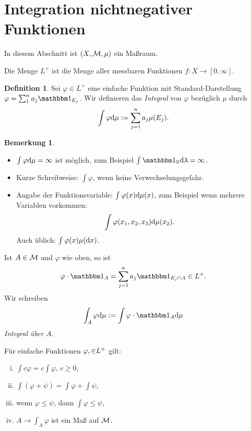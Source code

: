 \documentclass[
 a4paper,
 12pt,
 parskip=half
 ]{scrreprt}
\theoremstyle{plain}
\theoremstyle{definition}
\newtheorem{defn}[thm]{Definition}
\newtheorem*{rmrk*}{Bemerkung}
\numberwithin{equation}{section}
\begin{document}
\section{Integration nichtnegativer Funktionen}
In diesem Abschnitt ist $(X,\mathcal{M},\mu)$ ein Maßraum.

Die Menge $L^+$ ist die Menge aller messbaren Funktionen $f:X \to [0, \infty]$.

\begin{defn}
 Sei $\varphi \in L^+$ eine einfache Funktion mit Standard-Darstellung $\varphi = \sum_1^n a_j \ind_{E_j}$. Wir definieren das \emph{Integral} von $\varphi$ bezüglich $\mu$ durch
 \[ \int \varphi \mathrm{d} \mu := \sum_{j=1}^n a_j \mu( E_j ). \]
\end{defn}

\begin{rmrk*}
 \begin{itemize}
  \item $\int \varphi \mathrm{d} \mu = \infty$ ist möglich, zum Beispiel $\int \ind_\real \diffop \lambda = \infty$.
  \item Kurze Schreibweise: $\int \varphi$, wenn keine Verwechselungsgefahr.
  \item Angabe der Funktionsvariable: $\int \varphi(x) \mathrm{d} \mu(x)$, zum Beispiel wenn mehrere Variablen vorkommen:
  \[ \int \varphi( x_1, x_2, x_3 ) \mathrm{d} \mu(x_2). \]
  Auch üblich: $\int \varphi(x) \mu(\mathrm{d} x)$.
 \end{itemize}
\end{rmrk*}

Ist $A \in \mathcal{M}$ und $\varphi$ wie oben, so ist 
\[ \varphi \cdot \ind_A = \sum_{j=1}^n a_j \ind_{E_j \cap A} \in L^+. \]
Wir schreiben
\[ \int_A \varphi \diffop \mu := \int \varphi \cdot \ind_A \diffop \mu \]
\emph{Integral über $A$}.

\begin{lem}
 Für einfache Funktionen $\varphi, \si \in L^+$ gilt:
 \begin{enumerate}[(i)]
  \item $\int c \varphi = c \int \varphi$, $c \ge 0$,
  \item $\int(\varphi + \psi) = \int \varphi + \int \psi$,
  \item wenn $\varphi \le \psi$, dann $\int \varphi \le \psi$,
  \item $A \to \int_A \varphi$ ist ein Maß auf $\mathcal{M}$.
 \end{enumerate}
\end{lem}
\end{document}
